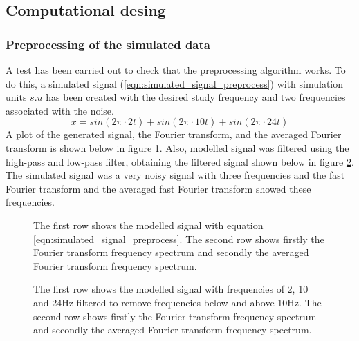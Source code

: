 \documentclass[12pt, a4paper]{article} %
\begin{document}
	\subsection{Computational desing}
	
	\subsubsection{Preprocessing of the simulated data}
	
	A test has been carried out to check that the preprocessing algorithm works. To do this, a simulated signal (\ref{eqn:simulated_signal_preprocess}) with simulation units $s.u$ has been created with the desired study frequency and two frequencies associated with the noise. 
	\setlength{\parskip}{4mm}
	\begin{equation} \label{eqn:simulated_signal_preprocess}
		x = sin(2\pi\cdot 2t) + sin(2\pi\cdot 10t) + sin(2\pi\cdot 24t)
	\end{equation}
	A plot of the generated signal, the Fourier transform, and the averaged Fourier transform is shown below in figure \ref{fig:noisy_data_simulated}. Also, modelled signal was filtered using the high-pass and low-pass filter, obtaining the filtered signal shown below in figure \ref{fig:noisy_filtered_data_simulated}. The simulated signal was a very noisy signal with three frequencies and the fast Fourier transform and the averaged fast Fourier transform showed these frequencies. 
	
	\begin{figure}[htbp]
		\centering
		
		\caption{The first row shows the modelled signal with equation \ref{eqn:simulated_signal_preprocess}. The second row shows firstly the Fourier transform frequency spectrum and secondly the averaged Fourier transform frequency spectrum.}
		\label{fig:noisy_data_simulated}
	\end{figure}
	
	
	\begin{figure}[htbp]
		\centering
		
		\caption{The first row shows the modelled signal with frequencies of 2, 10 and 24Hz filtered to remove frequencies below and above 10Hz. The second row shows firstly the Fourier transform frequency spectrum and secondly the averaged Fourier transform frequency spectrum.}
		\label{fig:noisy_filtered_data_simulated}
	\end{figure}
	
\end{document}
